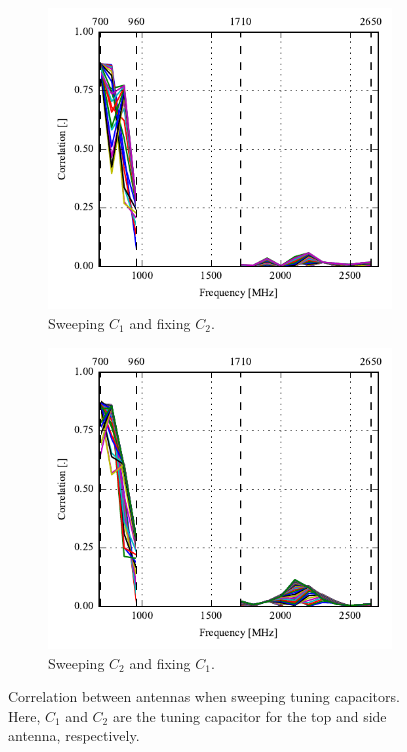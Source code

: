 \begin{figure}[htbp]
    \centering
    \begin{subfigure}{0.49\linewidth}
      \includegraphics{img/tech_sol/monopole/highband/sim/corr_top.pdf}
        \caption{Sweeping $C_1$ and fixing $C_2$.}
    \end{subfigure}
    \hfill
    \begin{subfigure}{0.49\linewidth}
        \includegraphics{img/tech_sol/monopole/highband/sim/corr_side.pdf}
        \caption{Sweeping $C_2$ and fixing $C_1$.}
    \end{subfigure}
    \caption{Correlation between antennas when sweeping tuning capacitors. Here, $C_1$ and $C_2$ are the tuning capacitor for the top and side antenna, respectively.}
    \label{fig:corr_mono_modi_sim_free}
\end{figure}

